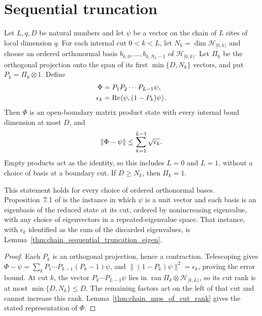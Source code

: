 \section{Sequential truncation}

\begin{lemma}
    \label{thm:chain_sequential_truncation_full}
    \leanok
    Let $L,q,D$ be natural numbers and let $\psi$ be a vector on the chain
    of $L$ sites of local dimension $q$. For each internal cut $0<k<L$,
    let $N_k=\dim\mathcal H_{[0,k)}$ and choose an ordered orthonormal basis
    $b_{k,0},\ldots,b_{k,N_k-1}$ of $\mathcal H_{[0,k)}$. Let $\Pi_k$ be
    the orthogonal projection onto the span of its first $\min\{D,N_k\}$
    vectors, and put $P_k=\Pi_k\otimes1$. Define
    \begin{align}
        \Phi       & =P_1P_2\cdots P_{L-1}\psi, \notag                         \\
        \epsilon_k & =\operatorname{Re}\langle\psi,(1-P_k)\psi\rangle . \notag
    \end{align}
    Then $\Phi$ is an open-boundary matrix product state with every internal
    bond dimension at most $D$, and
    \begin{align}
        \|\Phi-\psi\|\le\sum_{k=1}^{L-1}\sqrt{\epsilon_k}. \notag
    \end{align}
    Empty products act as the identity, so this includes $L=0$ and $L=1$,
    without a choice of basis at a boundary cut. If $D\ge N_k$, then
    $\Pi_k=1$.

    This statement holds for every choice of ordered orthonormal bases.
    Proposition~7.1 of \cite[Part~IIa]{TNLean2026OneDimensional} is the
    instance in which $\psi$ is a unit vector and each basis is an
    eigenbasis of the reduced state at its cut, ordered by nonincreasing
    eigenvalue, with any choice of eigenvectors in a repeated-eigenvalue
    space. That instance, with $\epsilon_k$ identified as the sum of the
    discarded eigenvalues, is Lemma~\ref{thm:chain_sequential_truncation_eigen}.
\end{lemma}
\begin{proof}
    \leanok
    Each $P_k$ is an orthogonal projection, hence a contraction. Telescoping
    gives
    $\Phi-\psi=\sum_k P_1\cdots P_{k-1}(P_k-1)\psi$,
    and $\|(1-P_k)\psi\|^2=\epsilon_k$, proving the error bound.
    At cut $k$, the vector $P_k\cdots P_{L-1}\psi$ lies in
    $\operatorname{ran}\Pi_k\otimes\mathcal H_{[k,L)}$, so its cut rank
    is at most $\min\{D,N_k\}\le D$. The remaining factors act on the
    left of that cut and cannot increase this rank.
    Lemma~\ref{thm:chain_mps_of_cut_rank} gives the stated representation
    of $\Phi$.
\end{proof}

